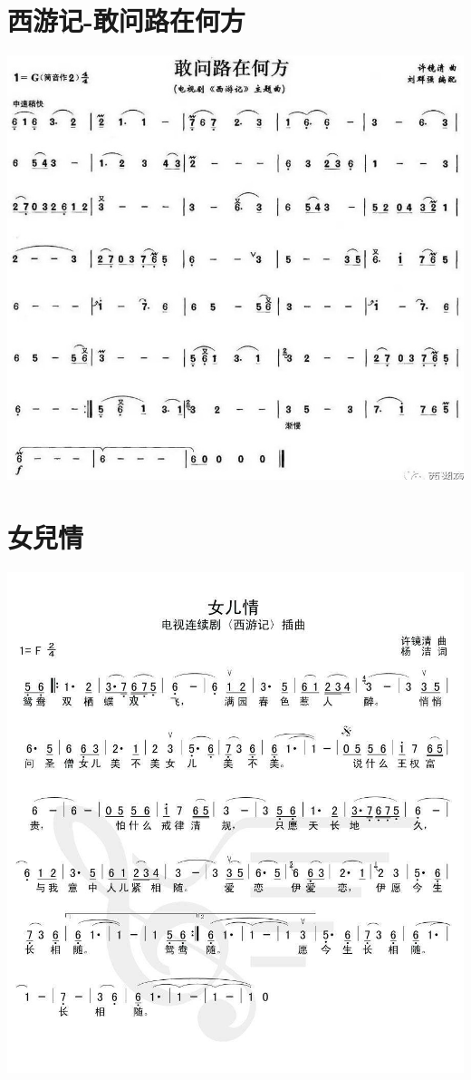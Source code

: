 \documentclass[cn,pad,chinesefont=nofont,twocol]{elegantbook}
\begin{document}
\section{西游记-敢问路在何方}\includegraphics[width=\textwidth]{dongxiao/20200819/西游记-敢问路在何方.jpeg}
\section{女兒情}          
	\includegraphics[width=\textwidth]{dongxiao/西游记-儿女情}  
	
\end{document}
